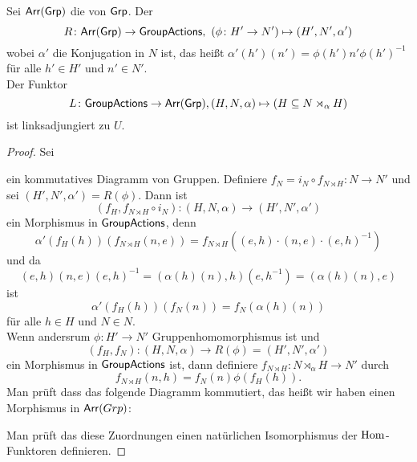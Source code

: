 \begin{Lemma}\label{Lem:AdjSemDir}
    Sei \(\mathsf{Arr}(\mathsf{Grp})\) die  von \(\mathsf{Grp}\). Der 
    \[R\colon \mathsf{Arr}(\mathsf{Grp})\to\mathsf{GroupActions},\ (\phi\colon H'\to N')\mapsto (H',N',\alpha')\] wobei \(\alpha'\) die Konjugation in \(N\) ist, das heißt \(\alpha'(h')(n')=\phi(h')n'\phi(h')^{-1}\) für alle \(h'\in H'\) und \(n'\in N'\).\\
    Der Funktor \[L\colon\mathsf{GroupActions}\to\mathsf{Arr}(\mathsf{Grp}), (H,N,\alpha)\mapsto (H\subseteq N\rtimes_\alpha H)\] ist linksadjungiert zu \(U\).
\end{Lemma}
\begin{proof}
     Sei %
 ein kommutatives Diagramm von Gruppen.
     Definiere \(f_N=i_N\circ f_{N\rtimes H}\colon N\to N'\) und sei \((H',N',\alpha')=R(\phi)\).
     Dann ist \[(f_H,f_{N\rtimes H}\circ i_N)\colon (H,N,\alpha)\to (H',N',\alpha')\] ein Morphismus in \(\mathsf{GroupActions}\), denn
     \[\alpha'(f_H(h))(f_{N\rtimes H}(n,e))=f_{N\rtimes H}((e,h)\cdot (n,e)\cdot (e,h)^{-1})\]
      und da \[(e,h)(n,e)(e,h)^{-1}=(\alpha(h)(n),h)(e,h^{-1})=(\alpha(h)(n),e)\]
      ist \[\alpha'(f_H(h))(f_{N}(n))=f_N(\alpha(h)(n))\] für alle \(h\in H\) und \(N\in N\).\\
      Wenn andersrum \(\phi\colon H'\to N'\) Gruppenhomomorphismus ist und \[(f_H,f_N)\colon(H,N,\alpha)\to R(\phi)=(H',N',\alpha')\] ein Morphismus in \(\mathsf{GroupActions}\) ist, dann definiere \(f_{N\rtimes H}\colon N\rtimes_\alpha H\to N'\) durch \[f_{N\rtimes H}(n,h)=f_N(n)\phi(f_H(h)).\]
      Man prüft dass das folgende Diagramm kommutiert, das heißt wir haben einen Morphismus in \(\mathsf{Arr}(Grp)\):
 Man prüft das diese Zuordnungen einen natürlichen Isomorphismus der \(\operatorname{Hom}\)-Funktoren definieren.
      
     \end{proof}

